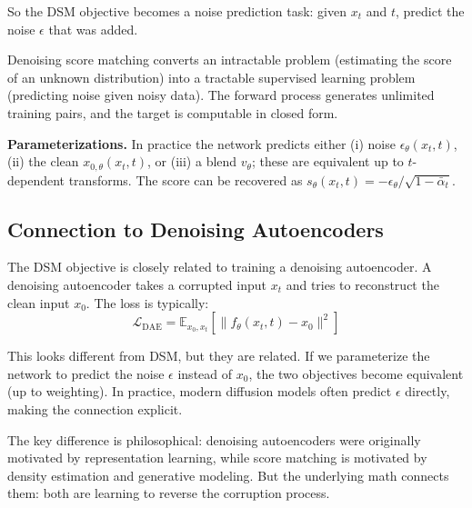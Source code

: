 \vspPara

So the DSM objective becomes a noise prediction task: given $x_t$ and $t$, predict the noise $\epsilon$ that was added.

\vspSection

\begin{keyinsight}
Denoising score matching converts an intractable problem (estimating the score of an unknown distribution) into a tractable supervised learning problem (predicting noise given noisy data). The forward process generates unlimited training pairs, and the target is computable in closed form.
\end{keyinsight}

\vspSection


\vspPara
\textbf{Parameterizations.} In practice the network predicts either (i) noise $\epsilon_\theta(x_t,t)$, (ii) the clean $x_{0,\theta}(x_t,t)$, or (iii) a blend $v_\theta$; these are equivalent up to $t$-dependent transforms. The score can be recovered as $s_\theta(x_t,t)=-\epsilon_\theta/\sqrt{1-\bar{\alpha}_t}$.
\subsection{Connection to Denoising Autoencoders}

The DSM objective is closely related to training a denoising autoencoder. A denoising autoencoder takes a corrupted input $x_t$ and tries to reconstruct the clean input $x_0$. The loss is typically:
%
\begin{equation}
\mathcal{L}_{\text{DAE}} = \mathbb{E}_{x_0, x_t} \left[ \| f_\theta(x_t, t) - x_0 \|^2 \right]
\end{equation}

\vspPara

This looks different from DSM, but they are related. If we parameterize the network to predict the noise $\epsilon$ instead of $x_0$, the two objectives become equivalent (up to weighting). In practice, modern diffusion models often predict $\epsilon$ directly, making the connection explicit.

\vspPara

The key difference is philosophical: denoising autoencoders were originally motivated by representation learning, while score matching is motivated by density estimation and generative modeling. But the underlying math connects them: both are learning to reverse the corruption process.

\vspChapter

